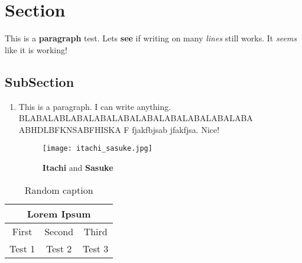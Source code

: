 \documentclass[12pt]{article}
\begin{document}
	\section*{Section}

		This is a \textbf{paragraph} test. Lets \textbf{see} if writing on many \textit{lines} still works. It \textit{seems} like it is working!

		\subsection{SubSection}

			\begin{enumerate}

				\item
				This is a paragraph. I can write anything. BLABALABLABALABALABALABALABALABALABALABA ABHDLBFKNSABFHISKA F fjakfbjsab jfakfjsa. Nice!

				\begin{figure}[H]
					\centering
					\texttt{[image: itachi\_sasuke.jpg]}
					\caption{\textbf{Itachi} and \textbf{Sasuke}}
				\end{figure}

			\end{enumerate}

		\begin{table}[H]
			\centering
			\begin{tabular}{|c|c|c|}
				\hline
				\multicolumn{3}{|c|}{\textbf{Lorem Ipsum}} \\
				\hline
				First & Second & Third \\
				\hline
				Test 1 & Test 2 & Test 3 \\
				\hline
			\end{tabular}
			\caption{Random caption}
		\end{table}
\end{document}
